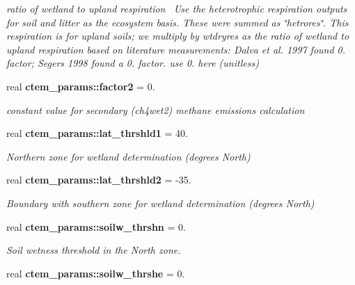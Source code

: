 \begin{DoxyCompactItemize}
\begin{DoxyCompactList}\small\item\em ratio of wetland to upland respiration~\newline
Use the heterotrophic respiration outputs for soil and litter as the ecosystem basis. These were summed as \char`\"{}hetrores\char`\"{}. This respiration is for upland soils; we multiply by wtdryres as the ratio of wetland to upland respiration based on literature measurements\+: Dalva et al. 1997 found 0. factor; Segers 1998 found a 0. factor. use 0. here (unitless) \end{DoxyCompactList}\item 
\hypertarget{namespacectem__params_aba1c91ff7281b9069ec03e8ecc581fef}{}real {\bfseries ctem\+\_\+params\+::factor2} = 0.\label{namespacectem__params_aba1c91ff7281b9069ec03e8ecc581fef}

\begin{DoxyCompactList}\small\item\em constant value for secondary (ch4wet2) methane emissions calculation \end{DoxyCompactList}\item 
\hypertarget{namespacectem__params_a3a63b83e7f97702b648861ae4a586b59}{}real {\bfseries ctem\+\_\+params\+::lat\+\_\+thrshld1} = 40.\label{namespacectem__params_a3a63b83e7f97702b648861ae4a586b59}

\begin{DoxyCompactList}\small\item\em Northern zone for wetland determination (degrees North) \end{DoxyCompactList}\item 
\hypertarget{namespacectem__params_ac0a149191207794d3a3867a93efc5757}{}real {\bfseries ctem\+\_\+params\+::lat\+\_\+thrshld2} = -\/35.\label{namespacectem__params_ac0a149191207794d3a3867a93efc5757}

\begin{DoxyCompactList}\small\item\em Boundary with southern zone for wetland determination (degrees North) \end{DoxyCompactList}\item 
\hypertarget{namespacectem__params_ab4795b61fccde1fc82638b5f8b9624aa}{}real {\bfseries ctem\+\_\+params\+::soilw\+\_\+thrshn} = 0.\label{namespacectem__params_ab4795b61fccde1fc82638b5f8b9624aa}

\begin{DoxyCompactList}\small\item\em Soil wetness threshold in the North zone. \end{DoxyCompactList}\item 
\hypertarget{namespacectem__params_adfd72c895e5b156dfa2bab6d694ab849}{}real {\bfseries ctem\+\_\+params\+::soilw\+\_\+thrshe} = 0.\label{namespacectem__params_adfd72c895e5b156dfa2bab6d694ab849}


\end{DoxyCompactItemize}
